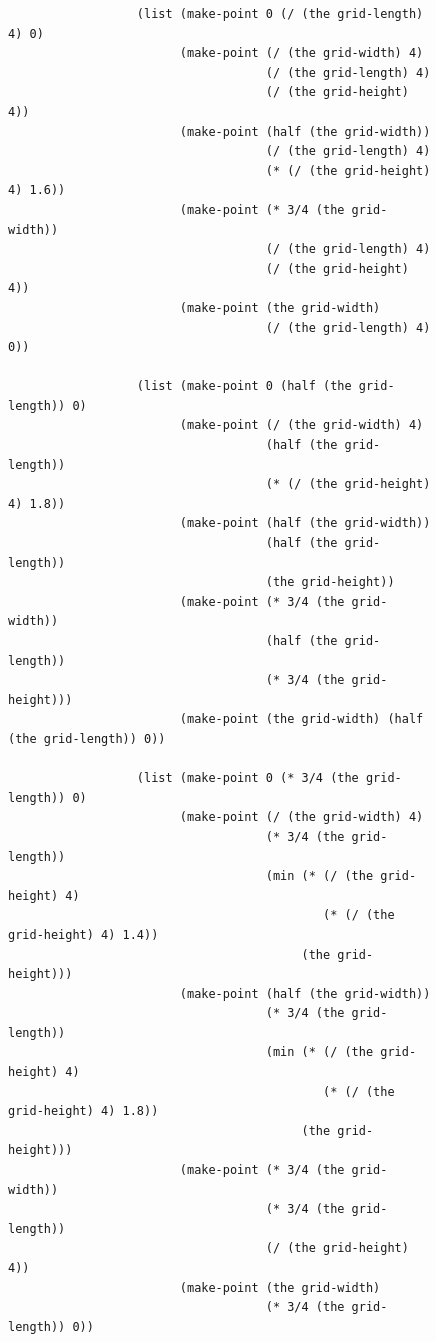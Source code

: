 \documentclass [11pt]{book}
\begin{document}
\begin{itemize}
\begin{figure}
\begin{lrbox}{\boxedverb}
\begin{minipage}{\linewidth}
{\begin{verbatim}
                  (list (make-point 0 (/ (the grid-length) 4) 0)
                        (make-point (/ (the grid-width) 4) 
                                    (/ (the grid-length) 4) 
                                    (/ (the grid-height) 4))
                        (make-point (half (the grid-width)) 
                                    (/ (the grid-length) 4) 
                                    (* (/ (the grid-height) 4) 1.6))
                        (make-point (* 3/4 (the grid-width)) 
                                    (/ (the grid-length) 4) 
                                    (/ (the grid-height) 4))
                        (make-point (the grid-width) 
                                    (/ (the grid-length) 4) 0))
                         
                  (list (make-point 0 (half (the grid-length)) 0)
                        (make-point (/ (the grid-width) 4) 
                                    (half (the grid-length)) 
                                    (* (/ (the grid-height) 4) 1.8))
                        (make-point (half (the grid-width)) 
                                    (half (the grid-length)) 
                                    (the grid-height))
                        (make-point (* 3/4 (the grid-width)) 
                                    (half (the grid-length)) 
                                    (* 3/4 (the grid-height)))
                        (make-point (the grid-width) (half (the grid-length)) 0))
                         
                  (list (make-point 0 (* 3/4 (the grid-length)) 0)
                        (make-point (/ (the grid-width) 4) 
                                    (* 3/4 (the grid-length)) 
                                    (min (* (/ (the grid-height) 4) 
                                            (* (/ (the grid-height) 4) 1.4)) 
                                         (the grid-height)))
                        (make-point (half (the grid-width)) 
                                    (* 3/4 (the grid-length)) 
                                    (min (* (/ (the grid-height) 4) 
                                            (* (/ (the grid-height) 4) 1.8)) 
                                         (the grid-height)))
                        (make-point (* 3/4 (the grid-width)) 
                                    (* 3/4 (the grid-length)) 
                                    (/ (the grid-height) 4))
                        (make-point (the grid-width) 
                                    (* 3/4 (the grid-length)) 0))
                         

\end{verbatim}}
\end{minipage}
\end{lrbox}
\end{figure}
\end{itemize}
\end{document}
